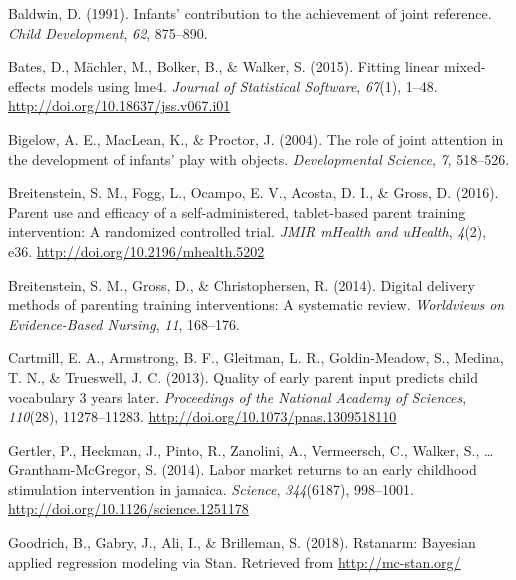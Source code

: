 \documentclass[man,floatsintext]{apa6}
\begin{document}
\begingroup
\setlength{\parindent}{-0.5in}
\setlength{\leftskip}{0.5in}

\hypertarget{refs}{}
\leavevmode\hypertarget{ref-Baldwin1991}{}%
Baldwin, D. (1991). Infants' contribution to the achievement of joint reference. \emph{Child Development}, \emph{62}, 875--890.

\leavevmode\hypertarget{ref-lme4}{}%
Bates, D., Mächler, M., Bolker, B., \& Walker, S. (2015). Fitting linear mixed-effects models using lme4. \emph{Journal of Statistical Software}, \emph{67}(1), 1--48. \url{http://doi.org/10.18637/jss.v067.i01}

\leavevmode\hypertarget{ref-Bigelow2004}{}%
Bigelow, A. E., MacLean, K., \& Proctor, J. (2004). The role of joint attention in the development of infants' play with objects. \emph{Developmental Science}, \emph{7}, 518--526.

\leavevmode\hypertarget{ref-Breitenstein2016}{}%
Breitenstein, S. M., Fogg, L., Ocampo, E. V., Acosta, D. I., \& Gross, D. (2016). Parent use and efficacy of a self-administered, tablet-based parent training intervention: A randomized controlled trial. \emph{JMIR mHealth and uHealth}, \emph{4}(2), e36. \url{http://doi.org/10.2196/mhealth.5202}

\leavevmode\hypertarget{ref-Breitenstein2014}{}%
Breitenstein, S. M., Gross, D., \& Christophersen, R. (2014). Digital delivery methods of parenting training interventions: A systematic review. \emph{Worldviews on Evidence-Based Nursing}, \emph{11}, 168--176.

\leavevmode\hypertarget{ref-Cartmill2013}{}%
Cartmill, E. A., Armstrong, B. F., Gleitman, L. R., Goldin-Meadow, S., Medina, T. N., \& Trueswell, J. C. (2013). Quality of early parent input predicts child vocabulary 3 years later. \emph{Proceedings of the National Academy of Sciences}, \emph{110}(28), 11278--11283. \url{http://doi.org/10.1073/pnas.1309518110}

\leavevmode\hypertarget{ref-Jamaica2014}{}%
Gertler, P., Heckman, J., Pinto, R., Zanolini, A., Vermeersch, C., Walker, S., \ldots{} Grantham-McGregor, S. (2014). Labor market returns to an early childhood stimulation intervention in jamaica. \emph{Science}, \emph{344}(6187), 998--1001. \url{http://doi.org/10.1126/science.1251178}

\leavevmode\hypertarget{ref-rstanarm}{}%
Goodrich, B., Gabry, J., Ali, I., \& Brilleman, S. (2018). Rstanarm: Bayesian applied regression modeling via Stan. Retrieved from \url{http://mc-stan.org/}
\end{document}

